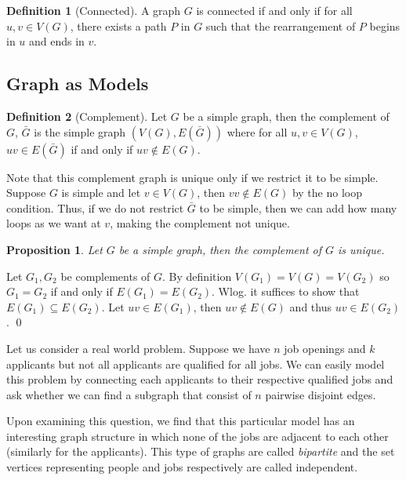 \documentclass[
]{article}
\newtheorem{prop}{Proposition}[theorem]
\theoremstyle{definition}
\newtheorem{definition}{Definition}[section]
\begin{document}
\begin{definition}[Connected]
  A graph \(G\) is connected if and only if for all \(u, v \in V(G)\), there 
  exists a path \(P\) in \(G\) such that the rearrangement of \(P\) begins in 
  \(u\) and ends in \(v\).
\end{definition}

\hypertarget{graph-as-models}{%
\subsection{Graph as Models}\label{graph-as-models}}

\begin{definition}[Complement]
  Let \(G\) be a simple graph, then the complement of \(G\), \(\bar{G}\) is the 
  simple graph \((V(G), E(\bar{G}))\) where for all \(u, v \in V(G)\), 
  \(uv \in E(\bar{G})\) if and only if \(uv \notin E(G)\).
\end{definition}

Note that this complement graph is unique only if we restrict it to be
simple. Suppose \(G\) is simple and let \(v \in V(G)\), then
\(vv \notin E(G)\) by the no loop condition. Thus, if we do not restrict
\(\bar{G}\) to be simple, then we can add how many loops as we want at
\(v\), making the complement not unique.

\begin{prop}
  Let \(G\) be a simple graph, then the complement of \(G\) is unique.
\end{prop}
\proof

Let \(G_1, G_2\) be complements of \(G\). By definition
\(V(G_1) = V(G) = V(G_2)\) so \(G_1 = G_2\) if and only if
\(E(G_1) = E(G_2)\). Wlog. it suffices to show that
\(E(G_1) \subseteq E(G_2)\). Let \(uv \in E(G_1)\), then
\(uv \notin E(G)\) and thus \(uv \in E(G_2)\). \qed

Let us consider a real world problem. Suppose we have \(n\) job openings
and \(k\) applicants but not all applicants are qualified for all jobs.
We can easily model this problem by connecting each applicants to their
respective qualified jobs and ask whether we can find a subgraph that
consist of \(n\) pairwise disjoint edges.

Upon examining this question, we find that this particular model has an
interesting graph structure in which none of the jobs are adjacent to
each other (similarly for the applicants). This type of graphs are
called \emph{bipartite} and the set vertices representing people and
jobs respectively are called independent.
\end{document}
